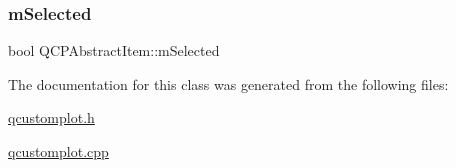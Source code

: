 \subsubsection{\texorpdfstring{m\+Selected}{mSelected}}
{\footnotesize\ttfamily bool Q\+C\+P\+Abstract\+Item\+::m\+Selected\hspace{0.3cm}{\ttfamily [protected]}}



The documentation for this class was generated from the following files\+:\begin{DoxyCompactItemize}
\item 
\hyperlink{qcustomplot_8h}{qcustomplot.\+h}\item 
\hyperlink{qcustomplot_8cpp}{qcustomplot.\+cpp}\end{DoxyCompactItemize}
